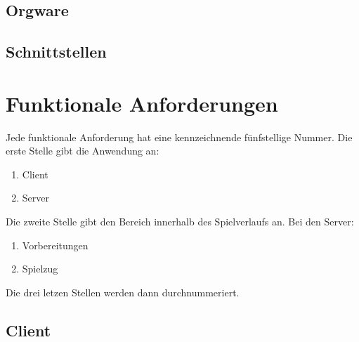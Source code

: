 \documentclass[a4paper,10pt]{article}
\begin{document}
\subsection{Orgware}
\subsection{Schnittstellen}
\section{Funktionale Anforderungen}
Jede funktionale Anforderung hat eine kennzeichnende fünfstellige Nummer. Die erste Stelle gibt die Anwendung an:
\begin{enumerate}
\item Client
\item Server
\end{enumerate}
Die zweite Stelle gibt den Bereich innerhalb des Spielverlaufs an. Bei den Server:
\begin{enumerate}
\item Vorbereitungen
\item Spielzug
\end{enumerate}
Die drei letzen Stellen werden dann durchnummeriert.
\subsection{Client}
\end{document}
